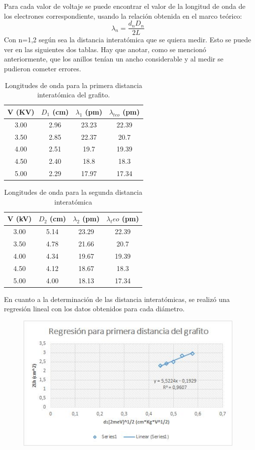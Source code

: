 \documentclass[%
 reprint,
 amsmath,amssymb,
 aps,
]{revtex4-1}
\begin{document}
Para cada valor de voltaje se puede encontrar el valor de la longitud de onda de los electrones correspondiente, usando la relación obtenida en el marco teórico: \[\lambda_n = \frac{d_n D_n}{2L} \] Con n=1,2 según sea la distancia interatómica que se quiera medir. Esto se puede ver en las siguientes dos tablas. Hay que anotar, como se mencionó anteriormente, que los anillos tenían un ancho considerable y al medir se pudieron cometer errores. \\

\begin{table}[h!]
\begin{tabular}{|c|c|c|c|}
	\hline V (KV) & $ D_1 $ (cm) & $ \lambda_1 $ (pm) & $ \lambda_{teo} $ (pm) \\ 
	\hline  3.00 &  2.96 &  23.23 &  22.39\\ 
	\hline  3.50 &  2.85 &  22.37 &  20.7\\ 
	\hline  4.00 &  2.51 &  19.7 &  19.39\\ 
	\hline  4.50 &  2.40 &  18.8 &  18.3\\ 
	\hline  5.00 &  2.29 &  17.97 &  17.34\\ 
	\hline
\end{tabular} 
\caption{Longitudes de onda para la primera distancia interatómica del grafito.} 
\end{table}

\begin{table}[h!]
\begin{tabular}{|c|c|c|c|}
	\hline  V (kV)& $ D_2 $ (cm) & $ \lambda_2 $ (pm) & $ \lambda_teo $ (pm)\\ 
	\hline  3.00 &  5.14 &  23.29 &  22.39 \\ 
	\hline  3.50 &  4.78 &  21.66 &  20.7 \\ 
	\hline  4.00 &  4.34 &  19.67 &  19.39 \\ 
	\hline  4.50 &  4.12 &  18.67 &  18.3 \\ 
	\hline  5.00 &  4.00 &  18.13 &  17.34 \\ 
	\hline
\end{tabular} 
\caption{Longitudes de onda para la segunda distancia interatómica} 
\end{table}

En cuanto a la determinación de las distancia interatómicas, se realizó una regresión lineal con los datos obtenidos para cada diámetro.\\

\begin{figure}[h!]
\centering
\includegraphics[width=0.7\linewidth]{regD1}
\caption[Regresión lineal para la primera distancia]{}
\label{fig:reg1}
\end{figure}
\end{document}
